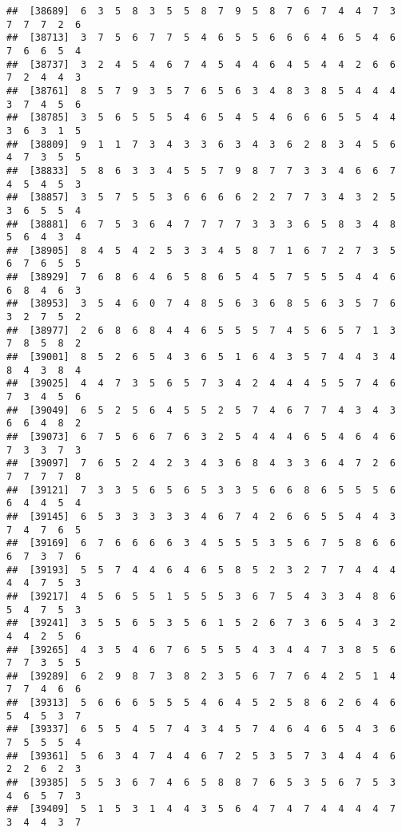 \documentclass[
]{book}
\begin{document}
\begin{verbatim}
##  [38689]  6  3  5  8  3  5  5  8  7  9  5  8  7  6  7  4  4  7  3  7  7  7  2  6
##  [38713]  3  7  5  6  7  7  5  4  6  5  5  6  6  6  4  6  5  4  6  7  6  6  5  4
##  [38737]  3  2  4  5  4  6  7  4  5  4  4  6  4  5  4  4  2  6  6  7  2  4  4  3
##  [38761]  8  5  7  9  3  5  7  6  5  6  3  4  8  3  8  5  4  4  4  3  7  4  5  6
##  [38785]  3  5  6  5  5  5  4  6  5  4  5  4  6  6  6  5  5  4  4  3  6  3  1  5
##  [38809]  9  1  1  7  3  4  3  3  6  3  4  3  6  2  8  3  4  5  6  4  7  3  5  5
##  [38833]  5  8  6  3  3  4  5  5  7  9  8  7  7  3  3  4  6  6  7  4  5  4  5  3
##  [38857]  3  5  7  5  5  3  6  6  6  6  2  2  7  7  3  4  3  2  5  3  6  5  5  4
##  [38881]  6  7  5  3  6  4  7  7  7  7  3  3  3  6  5  8  3  4  8  5  6  4  3  4
##  [38905]  8  4  5  4  2  5  3  3  4  5  8  7  1  6  7  2  7  3  5  6  7  6  5  5
##  [38929]  7  6  8  6  4  6  5  8  6  5  4  5  7  5  5  5  4  4  6  6  8  4  6  3
##  [38953]  3  5  4  6  0  7  4  8  5  6  3  6  8  5  6  3  5  7  6  3  2  7  5  2
##  [38977]  2  6  8  6  8  4  4  6  5  5  5  7  4  5  6  5  7  1  3  7  8  5  8  2
##  [39001]  8  5  2  6  5  4  3  6  5  1  6  4  3  5  7  4  4  3  4  8  4  3  8  4
##  [39025]  4  4  7  3  5  6  5  7  3  4  2  4  4  4  5  5  7  4  6  7  3  4  5  6
##  [39049]  6  5  2  5  6  4  5  5  2  5  7  4  6  7  7  4  3  4  3  6  6  4  8  2
##  [39073]  6  7  5  6  6  7  6  3  2  5  4  4  4  6  5  4  6  4  6  7  3  3  7  3
##  [39097]  7  6  5  2  4  2  3  4  3  6  8  4  3  3  6  4  7  2  6  7  7  7  7  8
##  [39121]  7  3  3  5  6  5  6  5  3  3  5  6  6  8  6  5  5  5  6  6  4  4  5  4
##  [39145]  6  5  3  3  3  3  3  4  6  7  4  2  6  6  5  5  4  4  3  7  4  7  6  5
##  [39169]  6  7  6  6  6  6  3  4  5  5  5  3  5  6  7  5  8  6  6  6  7  3  7  6
##  [39193]  5  5  7  4  4  6  4  6  5  8  5  2  3  2  7  7  4  4  4  4  4  7  5  3
##  [39217]  4  5  6  5  5  1  5  5  5  3  6  7  5  4  3  3  4  8  6  5  4  7  5  3
##  [39241]  3  5  5  6  5  3  5  6  1  5  2  6  7  3  6  5  4  3  2  4  4  2  5  6
##  [39265]  4  3  5  4  6  7  6  5  5  5  4  3  4  4  7  3  8  5  6  7  7  3  5  5
##  [39289]  6  2  9  8  7  3  8  2  3  5  6  7  7  6  4  2  5  1  4  7  7  4  6  6
##  [39313]  5  6  6  6  5  5  5  4  6  4  5  2  5  8  6  2  6  4  6  5  4  5  3  7
##  [39337]  6  5  5  4  5  7  4  3  4  5  7  4  6  4  6  5  4  3  6  7  5  5  5  4
##  [39361]  5  6  3  4  7  4  4  6  7  2  5  3  5  7  3  4  4  4  6  2  2  6  2  3
##  [39385]  5  5  3  6  7  4  6  5  8  8  7  6  5  3  5  6  7  5  3  4  6  5  7  3
##  [39409]  5  1  5  3  1  4  4  3  5  6  4  7  4  7  4  4  4  4  7  3  4  4  3  7

\end{verbatim}
\end{document}
